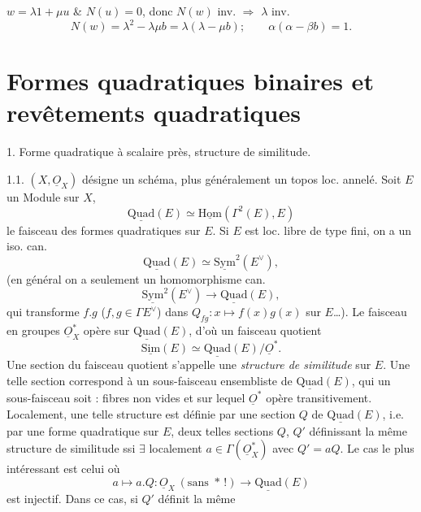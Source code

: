 \documentclass[11pt,a4paper]{article}
\begin{document}
$w = \lambda 1 + \mu u$ \&  $N(u) = 0$, donc  $N(w)$ inv. $\Longrightarrow$ $\lambda$ inv.
\[
  N(w) = \lambda^2 - \lambda\mu b = \lambda(\lambda - \mu b) ; \qquad \alpha(\alpha - \beta b) = 1 .
\]



\section{Formes quadratiques binaires et revêtements quadratiques}

1. Forme quadratique à scalaire près, structure de similitude.

1.1. $(X, \underline{O}_X)$ désigne un schéma, plus généralement un topos loc. annelé. Soit $E$ un Module sur $X$,
\[
  \underline{\mathrm{Quad}}(E) \simeq \underline{\mathrm{Hom}}(\Gamma^2(E), E)
\]
le faisceau des formes quadratiques sur $E$. Si $E$ est loc. libre de type fini, on a un iso. can.
\[
  \underline{\mathrm{Quad}}(E) \simeq \underline{\mathrm{Sym}}^2(E^\vee),
\]
(en général on a seulement un homomorphisme can.
\[
  \underline{\mathrm{Sym}}^2(E^\vee) \longrightarrow \underline{\mathrm{Quad}}(E),
\]
qui transforme $f.g$ ($f, g \in \Gamma E^\vee$) dans $Q_{fg} : x \mapsto f(x)g(x)$ sur $E$…).
Le faisceau \struck{\ill{}} en groupes $\underline{O}_X^*$ opère sur $\underline{\mathrm{Quad}}(E)$, d'où un faisceau quotient
\[
  \underline{\mathrm{Sim}}(E) \simeq \underline{\mathrm{Quad}}(E)/\underline{O}^* .
\]
Une section du faisceau quotient s'appelle une \emph{structure de similitude} sur $E$. Une telle section correspond à un sous-faisceau ensembliste de $\underline{\mathrm{Quad}}(E)$, qui \ill{} un sous-faisceau  soit : fibres non vides et sur lequel $\underline{O}^*$ opère transitivement. Localement, une telle structure est définie par une section $Q$ de $\underline{\mathrm{Quad}}(E)$, i.e. par une forme quadratique sur $E$, deux telles sections $Q$, $Q'$ définissant la même structure de similitude ssi $\exists$ localement $a \in \Gamma(\underline{O}_X^*)$ avec $Q' = aQ$. Le cas le plus intéressant est celui où 
\[
  a \longmapsto a.Q : \underline{O}_X \ (\text{sans } * \,!) \longrightarrow \underline{\mathrm{Quad}}(E)
\]
est injectif. Dans ce cas, si $Q'$  définit la même
\end{document}
